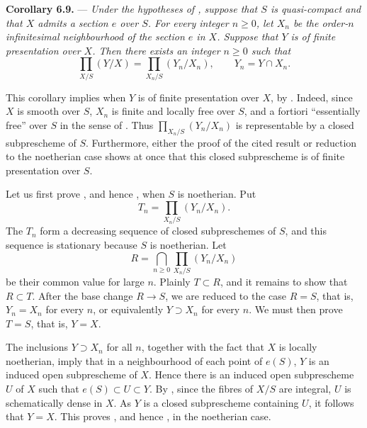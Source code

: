 \medskip
\noindent{}\textbf{Corollary 6.9.}
---
\textit{Under the hypotheses of
, suppose that \(S\) is
quasi-compact and that \(X\) admits a section \(e\) over \(S\).  For
every integer \(n\geq0\), let \(X_n\) be the order-\(n\)
infinitesimal neighbourhood of the section \(e\) in \(X\).  Suppose
that \(Y\) is of finite presentation over \(X\).  Then there exists
an integer \(n\geq0\) such that}
\[
  \prod_{X/S}(Y/X)
  =
  \prod_{X_n/S}(Y_n/X_n),
  \qquad Y_n=Y\cap X_n.
\]

This corollary implies
 when \(Y\) is of finite
presentation over \(X\), by .  Indeed, since \(X\)
is smooth over \(S\), \(X_n\) is finite and locally free over \(S\),
and a fortiori ``essentially free'' over \(S\) in the sense of
.  Thus \(\prod_{X_n/S}(Y_n/X_n)\) is representable
by a closed subprescheme of \(S\).  Furthermore, either the proof of
the cited result or reduction to the noetherian case shows at once
that this closed subprescheme is of finite presentation over \(S\).

Let us first prove , and hence
, when \(S\) is noetherian.  Put
\[
  T_n=\prod_{X_n/S}(Y_n/X_n).
\]
The \(T_n\) form a decreasing sequence of closed subpreschemes of
\(S\), and this sequence is stationary because \(S\) is noetherian.
Let
\[
  R=\bigcap_{n\geq0}\prod_{X_n/S}(Y_n/X_n)
\]
be their common value for large \(n\).  Plainly \(T\subset R\), and
it remains to show that \(R\subset T\).  After the base change
\(R\to S\), we are reduced to the case \(R=S\), that is,
\(Y_n=X_n\) for every \(n\), or equivalently
\(Y\supset X_n\) for every \(n\).  We must then prove \(T=S\), that
is, \(Y=X\).

The inclusions \(Y\supset X_n\) for all \(n\), together with the fact
that \(X\) is locally noetherian, imply that in a neighbourhood of
each point of \(e(S)\), \(Y\) is an induced open subprescheme of
\(X\).  Hence there is an induced open subprescheme \(U\) of \(X\)
such that \(e(S)\subset U\subset Y\).  By , since the
fibres of \(X/S\) are integral, \(U\) is schematically dense in
\(X\).  As \(Y\) is a closed subprescheme containing \(U\), it
follows that \(Y=X\).  This proves
, and hence
, in the noetherian case.

